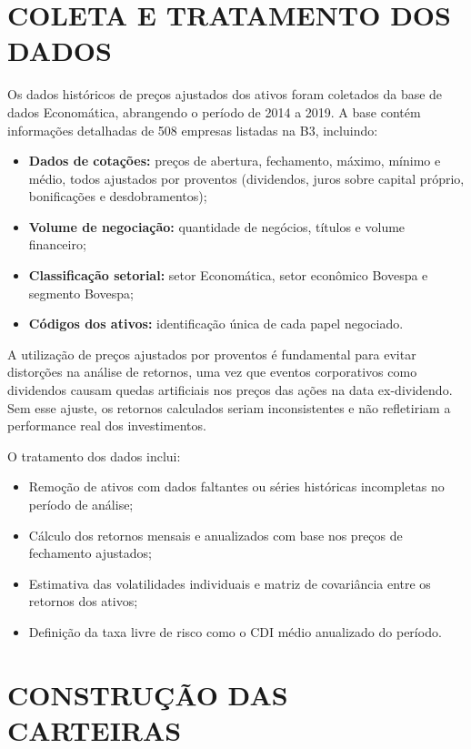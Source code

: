 \section{COLETA E TRATAMENTO DOS DADOS}

Os dados históricos de preços ajustados dos ativos foram coletados da base de dados Economática, abrangendo o período de 2014 a 2019. A base contém informações detalhadas de 508 empresas listadas na B3, incluindo:

\begin{itemize}
    \item \textbf{Dados de cotações:} preços de abertura, fechamento, máximo, mínimo e médio, todos ajustados por proventos (dividendos, juros sobre capital próprio, bonificações e desdobramentos);
    \item \textbf{Volume de negociação:} quantidade de negócios, títulos e volume financeiro;
    \item \textbf{Classificação setorial:} setor Economática, setor econômico Bovespa e segmento Bovespa;
    \item \textbf{Códigos dos ativos:} identificação única de cada papel negociado.
\end{itemize}

A utilização de preços ajustados por proventos é fundamental para evitar distorções na análise de retornos, uma vez que eventos corporativos como dividendos causam quedas artificiais nos preços das ações na data ex-dividendo. Sem esse ajuste, os retornos calculados seriam inconsistentes e não refletiriam a performance real dos investimentos.

O tratamento dos dados inclui:

\begin{itemize}
    \item Remoção de ativos com dados faltantes ou séries históricas incompletas no período de análise;
    \item Cálculo dos retornos mensais e anualizados com base nos preços de fechamento ajustados;
    \item Estimativa das volatilidades individuais e matriz de covariância entre os retornos dos ativos;
    \item Definição da taxa livre de risco como o CDI médio anualizado do período.
\end{itemize}

\section{CONSTRUÇÃO DAS CARTEIRAS}

